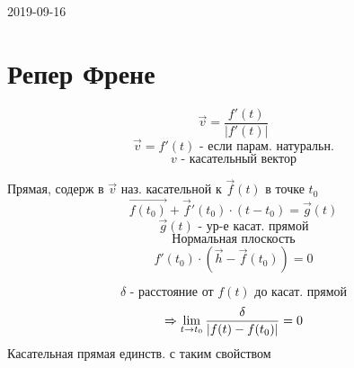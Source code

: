\documentclass[main, 12pt, fleqn]{subfiles}
\begin{document}
\begin{lect} {2019-09-16}
\section{Репер Френе}
	\begin{Definition}
		\[\vec{v} = \frac{f'(t)}{|f'(t)|}\]
		\[\vec{v} = f'(t) \text{ - если парам. натуральн.}\]
		\[v \text{ - касательный вектор}\]
	\end{Definition}
	
	\begin{Definition}
		Прямая, содерж в $\vec{v}$ наз. касательной к $\vec{f}(t)$ в точке $t_0$
		\[\vec{f(t_0)} + \vec{f}'(t_0) \cdot (t - t_0) = \vec{g}(t)\]
		\[\vec{g}(t) \text{ - ур-е касат. прямой}\]
		\[\text{Нормальная плоскость}\]
		\[f'(t_0) \cdot (\vec{h} - \vec{f}(t_0)) = 0\]
	\end{Definition}

	\begin{Theorem}
		\[\delta \text{ - расстояние от }f(t) \text{ до касат. прямой}\]
		\[\Rightarrow \lim_{t \to t_0} \frac{\delta}{|f(t) - f(t_0)|} = 0 \]
		Касательная прямая единств. с таким свойством
	\end{Theorem}

	\begin{Proof}
			
	\end{Proof}
\end{lect}
\end{document}
